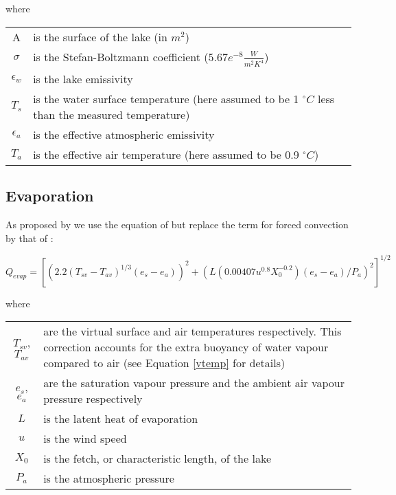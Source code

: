 \documentclass{bmc_template/bmcart}
\begin{document}
where
\begin{table}[h!]
\begin{tabular}{cp{8cm}}
    A & is the surface of the lake (in $m^2$) \\
    $\sigma$ & is the Stefan-Boltzmann coefficient ($5.67e^{-8} \frac{W}{m^2 K^4}$) \\
    $\epsilon_w$ & is the lake emissivity \\
    $T_s$ & is the water surface temperature (here assumed to be 1 $^{\circ}C$ less than the
    measured temperature) \\
    $\epsilon_a$ & is the effective atmospheric emissivity \\
    $T_a$ & is the effective air temperature (here assumed to be 0.9 $^{\circ}C$) \\ 
\end{tabular}
\end{table}

\subsection{Evaporation}
As proposed by \cite{hurstCraterLakeEnergy2015} we use the equation of
\cite{adamsEvaporationHeatedWater1990} but replace the term for forced
convection by that of \cite{sartoriCriticalReviewEquations2000}:

\begin{equation}
    Q_{evap} = [(2.2(T_{sv} - T_{av})^{1/3}(e_s - e_a))^2 + 
    (L(0.00407u^{0.8}X_0^{-0.2})(e_s - e_a)/P_a)^2]^{1/2}
\end{equation}

where
\begin{table}[h!]
\begin{tabular}{cp{8cm}}
    $T_{sv}$, $T_{av}$ & are the virtual surface and air temperatures respectively.
    This correction accounts for the extra buoyancy of water vapour compared to air
    (see Equation \ref{vtemp} for details) \\
    $e_s$, $e_a$ & are the saturation vapour pressure and the ambient air vapour
    pressure respectively \\
    $L$ & is the latent heat of evaporation \\
    $u$ & is the wind speed \\
    $X_0$ & is the fetch, or characteristic length, of the lake\\
    $P_a$ & is the atmospheric pressure \\
\end{tabular}
\end{table}
\end{document}
